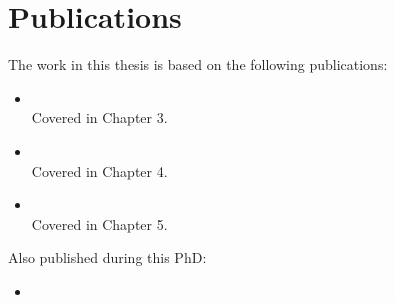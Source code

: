 \section{Publications}
The work in this thesis is based on the following publications:

\begin{itemize}
    \item {}\\ Covered in Chapter 3.
    \item {}\\ Covered in Chapter 4.
    \item {}\\ Covered in Chapter 5.
\end{itemize}

Also published during this PhD:

\begin{itemize}
    \item {}
\end{itemize}